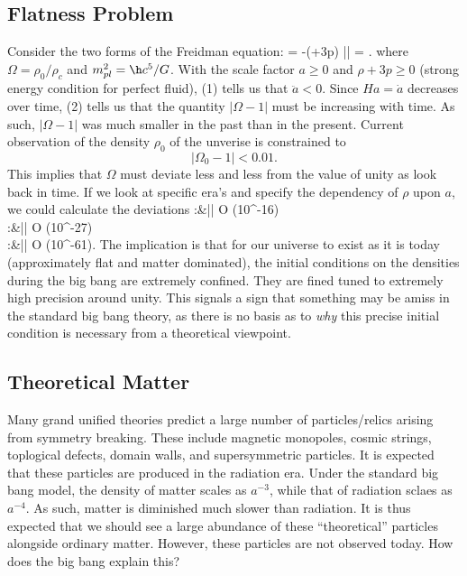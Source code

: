 \documentclass[10pt,letterpaper]{article}
\begin{document}
\subsection{Flatness Problem}
Consider the two forms of the Freidman equation:
\be
	 = -(\rho+3p)
\ee
\be
	|| = .
\ee
where $\Omega = \rho_0/\rho_c$ and $m_{pl}^2 =\h c^5/G$. 
With the scale factor $a\ge 0$ and $\rho+3p\ge 0$ (strong energy condition for perfect fluid), (1) tells us  that $\ddot a < 0$. Since $Ha = \dot a$ decreases over time, (2) tells us that the quantity $|\Omega - 1|$ must be increasing with time. As such, $|\Omega-1|$ was much smaller in the past than in the present. Current observation of the density $\rho_0$ of the unverise is constrained to
\[
	|\Omega_0-1| < 0.01.
\]
This implies that $\Omega$ must deviate less and less from the value of unity as look back in time. If we look at specific era's and specify the dependency of $\rho$ upon $a$, we could calculate the deviations
\ba
	:\quad &|| \le \mathcal O (10^{-16})\\
	:\quad &|| \le \mathcal O (10^{-27})\\
	:\quad &|| \le \mathcal O (10^{-61}).
\ea
The implication is that for our universe to exist as it is today (approximately flat and matter dominated), the initial conditions on the densities during the big bang are extremely confined. They are fined tuned to extremely high precision around unity. This signals a sign that something may be amiss in the standard big bang theory, as there is no basis as to \emph{why} this precise initial condition is necessary from a theoretical viewpoint. 
\subsection{Theoretical Matter}
Many grand unified theories predict a large number of particles/relics arising from symmetry breaking. These include magnetic monopoles, cosmic strings, toplogical defects, domain walls, and supersymmetric particles. It is expected that these particles are produced in the radiation era. Under the standard big bang model, the density of matter scales as $a^{-3}$, while that of radiation sclaes as $a^{-4}$. As such, matter is diminished much slower than radiation. It is thus expected that we should see a large abundance of these ``theoretical'' particles alongside ordinary matter. However, these particles are not observed today. How does the big bang explain this?
\end{document}
